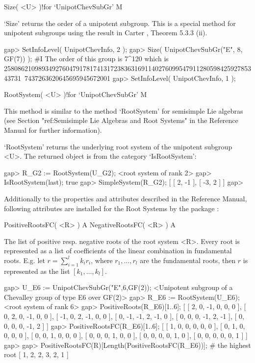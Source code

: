 \>Size( <U> )!{for `UnipotChevSubGr'} M

`Size' returns  the order  of a unipotent subgroup.  This  is  a
special  method for  unipotent  subgroups  using the  result  in
Carter \cite{Carter72}, Theorem 5.3.3 (ii).

\beginexample
gap> SetInfoLevel( UnipotChevInfo, 2 );
gap> Size( UnipotChevSubGr("E", 8, GF(7)) );
#I  The order of this group is 7^120 which is
25808621098934927604791781741317238363169114027609954791128059842592785343731\
7437263620645695945672001
gap> SetInfoLevel( UnipotChevInfo, 1 );
\endexample


\>RootSystem( <U> )!{for `UnipotChevSubGr'} M

This  method is similar  to the  method `RootSystem'  for semisimple  Lie
algebras (see Section "ref:Semisimple  Lie Algebras and Root  Systems" in
the {\GAP} Reference Manual for further information).

`RootSystem' returns the underlying root system of the unipotent subgroup
<U>. The returned object is from the category `IsRootSystem':

\beginexample
gap> R_G2 := RootSystem(U_G2);
<root system of rank 2>
gap> IsRootSystem(last);
true
gap> SimpleSystem(R_G2);
[ [ 2, -1 ], [ -3, 2 ] ]
gap>
\endexample

Additionally to the properties and attributes described in the  Reference
Manual, following attributes  are installed for the  Root  Systems by the
package {\Unipot}:

\>PositiveRootsFC( <R> ) A
\>NegativeRootsFC( <R> ) A

The list of positive resp. negative  roots of the root system <R>.  Every
root is  represented as a list of coefficients  of the linear combination
in fundamental  roots. E.g.  let  $r=\sum_{i=1}^l  k_ir_i$,  where  $r_1,
\dots, r_l$ are the  fundamental roots,  then  $r$ is represented as  the
list $[k_1, \dots, k_l]$.

\beginexample
gap> U_E6 := UnipotChevSubGr("E",6,GF(2));
<Unipotent subgroup of a Chevalley group of type E6 over GF(2)>
gap> R_E6 := RootSystem(U_E6);
<root system of rank 6>
gap> PositiveRoots(R_E6){[1..6]};
[ [ 2,  0, -1, 0,  0, 0 ], [ 0, 2, 0, -1, 0,  0 ], [ -1, 0, 2, -1,  0, 0 ],
  [ 0, -1, -1, 2, -1, 0 ], [ 0, 0, 0, -1, 2, -1 ], [  0, 0, 0,  0, -1, 2 ] ]
gap> PositiveRootsFC(R_E6){[1..6]};
[ [ 1, 0, 0, 0, 0, 0 ], [ 0, 1, 0, 0, 0, 0 ], [ 0, 0, 1, 0, 0, 0 ],
  [ 0, 0, 0, 1, 0, 0 ], [ 0, 0, 0, 0, 1, 0 ], [ 0, 0, 0, 0, 0, 1 ] ]
gap>
gap> PositiveRootsFC(R)[Length(PositiveRootsFC(R_E6))]; # the highest root
[ 1, 2, 2, 3, 2, 1 ]
\endexample

